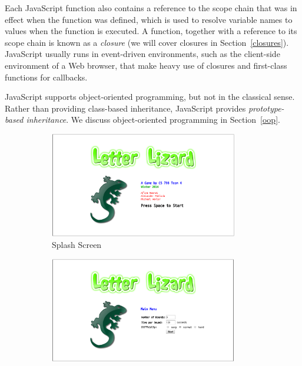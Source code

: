 Each JavaScript function also contains a reference to the scope chain that was
in effect when the function was defined, which is used to resolve variable
names to values when the function is executed. A function, together with a
reference to its scope chain is known as a \emph{closure} (we will cover closures
in Section~\ref{closures}). 
JavaScript usually runs in event-driven environments, such as the client-side
environment of a Web browser, that make heavy use of closures and first-class 
functions for callbacks.

JavaScript supports object-oriented programming, but not in the classical
sense. Rather than providing class-based inheritance, JavaScript provides
\emph{prototype-based inheritance}. We discuss object-oriented programming
in Section~\ref{oop}.

\begin{figure}
    \centering
    \begin{subfigure}{0.49\textwidth}
        \includegraphics[width=0.9\textwidth]{../screenshots/LetterLizardJS-SplashScreen2.png}
        \caption{Splash Screen}
        \label{lljssplash}
    \end{subfigure}
    \begin{subfigure}{0.49\textwidth}
        \includegraphics[width=0.9\textwidth]{../screenshots/LetterLizardJS-MainMenu2.png}

\end{subfigure}
\end{figure}
